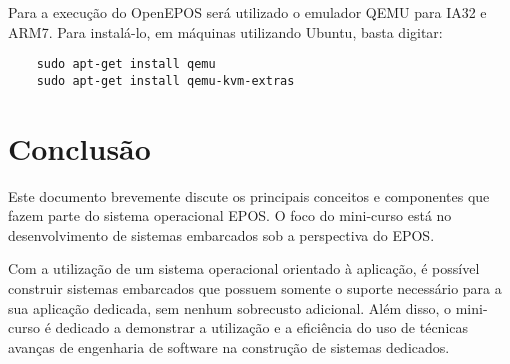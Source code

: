 \documentclass[11pt,twocolumn]{article}
\begin{document}
Para a execução do OpenEPOS será utilizado o emulador QEMU para IA32 e ARM7. Para instalá-lo, em máquinas utilizando Ubuntu, basta digitar:

\begin{verbatim}
	sudo apt-get install qemu
	sudo apt-get install qemu-kvm-extras
\end{verbatim}

\section{Conclusão}
\label{sec:conc}

Este documento brevemente discute os principais conceitos e componentes que fazem parte do sistema operacional \textsc{EPOS}. O foco do mini-curso está no desenvolvimento de sistemas embarcados sob a perspectiva do \textsc{EPOS}. 

Com a utilização de um sistema operacional orientado à aplicação, é possível construir sistemas embarcados que possuem somente o suporte necessário para a sua aplicação dedicada, sem nenhum sobrecusto adicional. Além disso, o mini-curso é dedicado a demonstrar a utilização e a eficiência do uso de técnicas avanças de engenharia de software na construção de sistemas dedicados.



\end{document}
